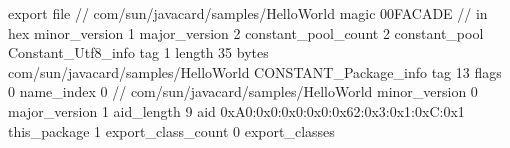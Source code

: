 export file {		// com/sun/javacard/samples/HelloWorld
	magic	00FACADE		 // in hex
	minor_version	1
	major_version	2
	constant_pool_count	2
	constant_pool {
		Constant_Utf8_info {
			tag	1
			length	35
			bytes	com/sun/javacard/samples/HelloWorld
		}
		CONSTANT_Package_info {
			tag	13
			flags	0
			name_index	0		// com/sun/javacard/samples/HelloWorld
			minor_version	0
			major_version	1
			aid_length	9
			aid	0xA0:0x0:0x0:0x0:0x62:0x3:0x1:0xC:0x1
		}
	}
	this_package	1
	export_class_count	0
	export_classes {
	}
}
